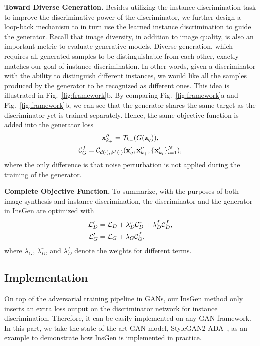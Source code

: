 \documentclass{article}
\begin{document}
\textbf{Toward Diverse Generation.}
Besides utilizing the instance discrimination task to improve the discriminative power of the discriminator, we further design a loop-back mechanism to in turn use the learned instance discrimination to guide the generator.
Recall that image diversity, in addition to image quality, is also an important metric to evaluate generative models.
Diverse generation, which requires all generated samples to be distinguishable from each other, exactly matches our goal of instance discrimination.
In other words, given a discriminator with the ability to distinguish different instances, we would like all the samples produced by the generator to be recognized as different ones.
This idea is illustrated in Fig.~\ref{fig:framework}b.
By comparing Fig.~\ref{fig:framework}a and Fig.~\ref{fig:framework}b, we can see that the generator shares the same target as the discriminator yet is trained separately.
Hence, the same objective function is added into the generator loss
\begin{gather}
     {\rm\bf x}''_{k_+} = {\mathcal{T}}_{k_+}(G({\rm\bf z}_q)), \\
    {\mathcal{C}}^f_G={\mathcal{C}}_{d(\cdot), \phi^f(\cdot)}({\rm\bf x}'_q, {\rm\bf x}''_{k_+}, \{{\rm\bf x}'_{k_i}\}_{i=1}^{N}), \label{eqa:fake_cl_on_g}
\end{gather}
where the only difference is that noise perturbation is not applied during the training of the generator.


\textbf{Complete Objective Function.}
To summarize, with the purposes of both image synthesis and instance discrimination, the discriminator and the generator in InsGen are optimized with
\begin{align}
    {\mathcal{L}}^{\prime}_D & = {\mathcal{L}}_D + \lambda^r_D {\mathcal{C}}^r_D + \lambda^f_D {\mathcal{C}}^f_D, \label{eqa:new_loss_d} \\
    {\mathcal{L}}^{\prime}_G & = {\mathcal{L}}_G + \lambda_G {\mathcal{C}}^f_G, \label{eqa:new_loss_g}
\end{align}
where $\lambda_G$, $\lambda^r_D$, and $\lambda^f_D$ denote the weights for different terms.


\subsection{Implementation}\label{subsec:usage}


On top of the adversarial training pipeline in GANs, our InsGen method only inserts an extra loss output on the discriminator network for instance discrimination.
Therefore, it can be easily implemented on any GAN framework.
In this part, we take the state-of-the-art GAN model, StyleGAN2-ADA~\cite{karras2020training}, as an example to demonstrate how InsGen is implemented in practice.
\end{document}
